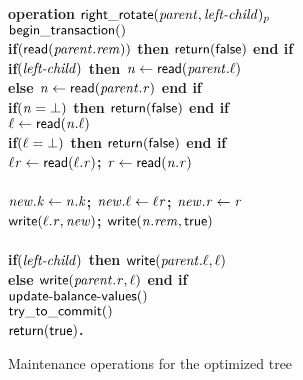 \begin{figure}[h!]
{{\begin{minipage}[t]{150mm}
\begin{tabbing}
		
		
		
\bf{operation} $\act{right\_rotate}(\ms{parent}, \ms{left-child})_p$ \\
		 \> $\lit{begin\_transaction}()$ \\
		 \> \bf{if}$(\lit{read}(\ms{parent.rem}))$ \bf{then} $\sf{return}(\lit{false})$ \bf{end if}\\%
		 \> \bf{if}$(\ms{left-child})$ \bf{then} $\ms{n} \gets \lit{read}(\ms{parent.\ell})$ \\
		 \>\> \bf{else} $\ms{n} \gets \lit{read}(\ms{parent.r})$ {\bf end if} \\
		 \> \bf{if}$(\ms{n = \bot})$ \bf{then} $\sf{return}(\lit{false})$ \bf{end if} \\
		 \> $\ms{\ell} \gets \lit{read}(\ms{n.\ell})$ \\
		 \> \bf{if}$(\ms{\ell = \bot})$ \bf{then} $\sf{return}(\lit{false})$ \bf{end if} \\%
		 \> $\ms{\ell{}r} \gets \lit{read}(\ms{\ell.r})$; $\ms{r} \gets \lit{read}(\ms{n.r})$ \\
		 \>  \\%
		 \> $\ms{new.k} \gets \ms{n.k}$; $\ms{new.\ell} \gets \ms{\ell{}r}$; $\ms{new.r} \gets \ms{r}$ \\%
		 \> $\lit{write}(\ms{\ell.r}, \ms{new})$; $\lit{write}(\ms{n.rem}, \lit{true})$ \\%
		 \>  \\
		 \> \bf{if}$(\ms{left-child})$ \bf{then} $\lit{write}(\ms{parent.\ell}, \ms{\ell})$ \\%
		 \> \bf{else} $\lit{write}(\ms{parent.r}, \ms{\ell})$ \bf{end if} \\%
		 \> $\act{update-balance-values()}$ \\%
		 \> $\lit{try\_to\_commit}()$ \\
		 \> $\sf{return}(\lit{true})$. \\
		
		

\end{tabbing}
\normalsize
\end{minipage}
}
\caption{Maintenance operations for the optimized tree}
\label{fig:tree-opt-maintenance}
}
\end{figure}
